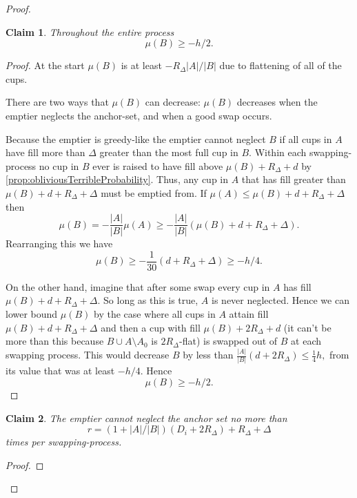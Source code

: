 \documentclass[twocolumn]{article}[10pt]
\newtheorem{clm}{Claim}
\begin{document}
\begin{proof}
\begin{clm}
  \label{clm:muBdoesntSinkTooLow}
  Throughout the entire process
  $$\mu(B) \ge -h/2.$$
\end{clm}
\begin{proof}

  At the start $\mu(B)$ is at least $-R_\Delta |A|/|B|$ due to flattening
  of all of the cups.

  There are two ways that $\mu(B)$ can decrease: $\mu(B)$
  decreases when the emptier neglects the anchor-set, and
  when a good swap occurs. 

  Because the emptier is greedy-like the emptier cannot neglect
  $B$ if all cups in $A$ have fill more than $\Delta$ greater
  than the most full cup in $B$. Within each swapping-process no
  cup in $B$ ever is raised to have fill above $\mu(B) + R_\Delta
  + d$ by \cref{prop:obliviousTerribleProbability}. Thus, any cup in $A$
  that has fill greater than $\mu(B) + d + R_\Delta + \Delta$
  must be emptied from. If $\mu(A) \le \mu(B) + d +
  R_\Delta + \Delta$ then
  $$\mu(B) = -\frac{|A|}{|B|}\mu(A) \ge
  -\frac{|A|}{|B|}\left(\mu(B) + d + R_\Delta + \Delta\right).$$
  Rearranging this we have
  $$\mu(B) \ge -\frac{1}{30}(d + R_\Delta + \Delta) \ge -h/4.$$

  On the other hand, imagine that after some swap every cup in
  $A$ has fill $\mu(B) + d + R_\Delta + \Delta$. So long as this
  is true, $A$ is never neglected. Hence we can
  lower bound $\mu(B)$ by the case where all cups in $A$ attain
  fill $\mu(B) + d + R_\Delta + \Delta$ and then a cup with fill $\mu(B) +
  2R_\Delta + d$ (it can't be more than this because $B\cup A\setminus
  A_0$ is $2R_\Delta$-flat) is swapped out of $B$ at each swapping process.
  This would decrease $B$ by less than $\frac{|A|}{|B|}
  (d+2R_\Delta) \le \frac{1}{4} h,$ from its value that was at least $-h/4$. Hence
  $$\mu(B) \ge -h/2.$$
\end{proof}

\begin{clm}
  \label{clm:emptierCantNeglectAnchorTooMuch}
  The emptier cannot neglect the anchor set no more than 
  $$r = (1+|A|/|B|)(D_i + 2R_\Delta) + R_\Delta + \Delta$$
  times per swapping-process.
\end{clm}
\begin{proof}


\end{proof}
\end{proof}
\end{document}
